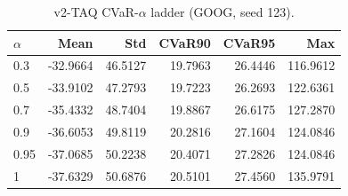 \begin{table}[H]
    \centering
    \caption{v2-TAQ CVaR-$\alpha$ ladder (GOOG, seed 123).}
    \label{tab:v2_taq_alpha}
    \begin{tabular}{@{}lrrrrr@{}}
        \toprule
        $\alpha$ & Mean & Std & CVaR90 & CVaR95 & Max \\
        \midrule
        0.3 & -32.9664 & 46.5127 & 19.7963 & 26.4446 & 116.9612 \\
        0.5 & -33.9102 & 47.2793 & 19.7223 & 26.2693 & 122.6361 \\
        0.7 & -35.4332 & 48.7404 & 19.8867 & 26.6175 & 127.2870 \\
        0.9 & -36.6053 & 49.8119 & 20.2816 & 27.1604 & 124.0846 \\
        0.95 & -37.0685 & 50.2238 & 20.4071 & 27.2826 & 124.0846 \\
        1 & -37.6329 & 50.6876 & 20.5101 & 27.4560 & 135.9791 \\
        \bottomrule
    \end{tabular}
\end{table}
